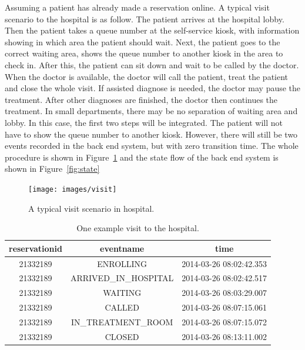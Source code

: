 Assuming a patient has already made a reservation online. A typical visit scenario to the hospital is as follow. The patient arrives at the hospital lobby. Then the patient takes a queue number at the self-service kiosk, with information showing in which area the patient should wait. Next, the patient goes to the correct waiting area, shows the queue number to another kiosk in the area to check in. After this, the patient can sit down and wait to be called by the doctor. When the doctor is available, the doctor will call the patient, treat the patient and close the whole visit. If assisted diagnose is needed, the doctor may pause the treatment. After other diagnoses are finished, the doctor then continues the treatment. In small departments, there may be no separation of waiting area and lobby. In this case, the first two steps will be integrated. The patient will not have to show the queue number to another kiosk. However, there will still be two events recorded in the back end system, but with zero transition time. The whole procedure is shown in Figure~\ref{fig:visit} and the state flow of the back end system is shown in Figure~\ref{fig:state}

\begin{figure}
	\begin{center}
		\texttt{[image: images/visit]}
		\caption{A typical visit scenario in hospital.}
		\label{fig:visit}
	\end{center}
\end{figure}

\begin{table}
	\caption{One example visit to the hospital.}
	\label{table:example}
	\begin{tabular}{|c|c|c|}
		\hline
		 reservationid &      eventname      &          time	\\ \hline

	      21332189 & ENROLLING           & 2014-03-26 08:02:42.353	\\ \hline
	      21332189 & ARRIVED\_IN\_HOSPITAL & 2014-03-26 08:02:42.517	\\ \hline
    	  21332189 & WAITING             & 2014-03-26 08:03:29.007	\\ \hline
	      21332189 & CALLED              & 2014-03-26 08:07:15.061	\\ \hline
    	  21332189 & IN\_TREATMENT\_ROOM   & 2014-03-26 08:07:15.072	\\ \hline
	      21332189 & CLOSED              & 2014-03-26 08:13:11.002	\\ \hline
	\end{tabular}
\end{table}

